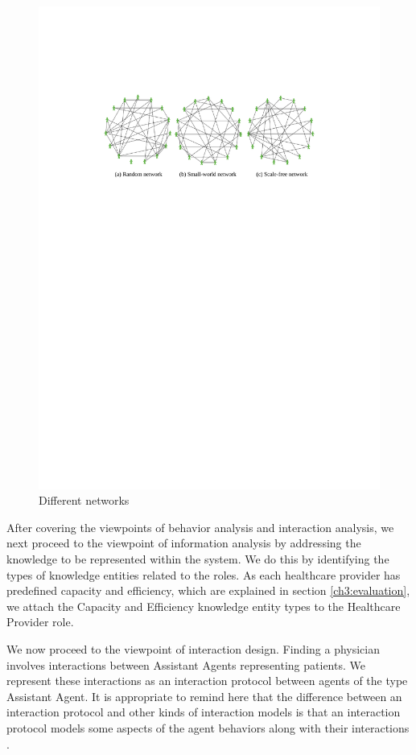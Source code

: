 \begin{figure}
\centering
\includegraphics[scale=1]{chap3/chap3-fnetworks.pdf}
\caption{Different networks}
\label{ch3:fnetworks}
\end{figure} 
	
After covering the viewpoints of behavior analysis and interaction analysis, we next proceed to the viewpoint of information analysis by addressing the knowledge to be represented within the system. We do this by identifying the types of knowledge entities related to the roles. As each healthcare provider has predefined capacity and efficiency, which are explained in section \ref{ch3:evaluation}, we attach the Capacity and Efficiency knowledge entity types to the Healthcare Provider role.

We now proceed to the viewpoint of interaction design. Finding a physician involves interactions between Assistant Agents representing patients. We represent these interactions as an interaction protocol between agents of the type Assistant Agent. It is appropriate to remind here that the difference between an interaction protocol and other kinds of interaction models is that an interaction protocol models some aspects of the agent behaviors along with their interactions \cite{sterling2009}.

